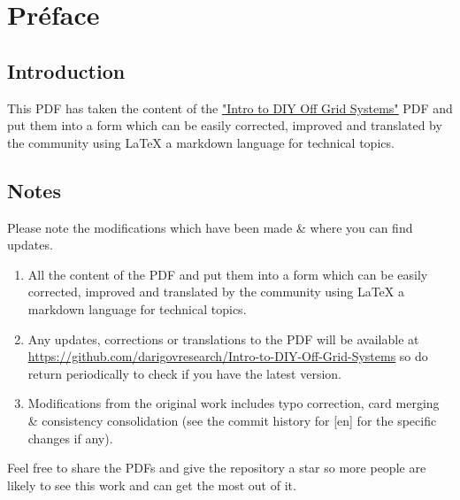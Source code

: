 \documentclass{article}
\theoremstyle{definition}
\theoremstyle{definition}
\theoremstyle{remark}
\begin{document}
\newpage

\tableofcontents

\newpage

{\color{blue}\section{Préface}} %
\label{sec:preface}

  {\color{blue}\subsection*{Introduction}} %
  \label{sub:introduction}
  
    This PDF has taken the content of the \href{https://www.demandenergyequality.org/get-started-with-offgrid}{\underline{"Intro to DIY Off Grid Systems"}} PDF and put them into a form which can be easily corrected, improved and translated by the community using LaTeX a markdown language for technical topics.


  {\color{blue}\subsection*{Notes}} %
  \label{sub:notes}

    Please note the modifications which have been made \& where you can find updates.

    \begin{enumerate}
      \item All the content of the PDF and put them into a form which can be easily corrected, improved and translated by the community using LaTeX a markdown language for technical topics.
      \item Any updates, corrections or translations to the PDF will be available at \href{https://github.com/darigovresearch/Intro-to-DIY-Off-Grid-Systems}{\underline{https://github.com/darigovresearch/Intro-to-DIY-Off-Grid-Systems}} so do return periodically to check if you have the latest version.
      \item Modifications from the original work includes typo correction, card merging \& consistency consolidation (see the commit history for [en] for the specific changes if any).
    \end{enumerate}

    Feel free to share the PDFs and give the repository a star so more people are likely to see this work and can get the most out of it.
\end{document}
